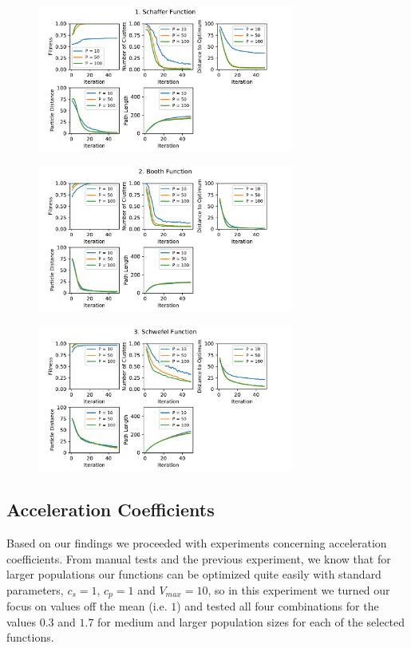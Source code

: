 \documentclass[12pt]{article}
\begin{document}
\begin{figure}
	\centering
	\includegraphics[width=0.75\textwidth]{figures/ex2/ex2-1.pdf}
	\label{fig:ex2-1}
\end{figure}
\begin{figure}
	\centering
	\includegraphics[width=0.75\textwidth]{figures/ex2/ex2-2.pdf}
	\label{fig:ex2-2}
\end{figure}
\begin{figure}
	\centering
	\includegraphics[width=0.75\textwidth]{figures/ex2/ex2-3.pdf}
	\label{fig:ex2-3}
\end{figure}


\subsection{Acceleration Coefficients}
Based on our findings we proceeded with experiments concerning acceleration coefficients. From manual tests and the previous experiment, we know that for larger populations our functions can be optimized quite easily with standard parameters, $c_s=1$, $c_p=1$ and $V_{max}=10$, so in this experiment we turned our focus on values off the mean (i.e. $1$) and tested all four combinations for the values $0.3$ and $1.7$ for medium and larger population sizes for each of the selected functions. 
\end{document}
